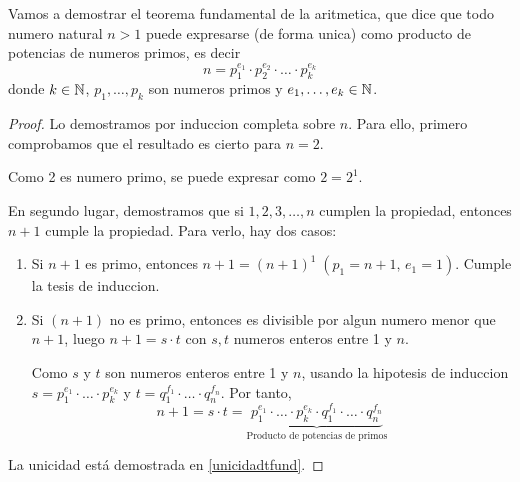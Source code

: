 \begin{example}
	\label{tfundaritmetica}
	Vamos a demostrar el teorema fundamental de la aritmetica, que dice que todo numero natural \(n > 1 \) puede expresarse (de forma unica) como producto de potencias de numeros primos, es decir
	\[
		n = p^{e_1}_1 \cdot p^{e_2}_2 \cdot \ldots \cdot p^{e_k}_k
	\]
	donde \(k \in \mathbb{N} \), \(p_1, \ldots, p_k \) son numeros primos y \(e_1, \ldots, e_k \in \mathbb{N} \).
\end{example}
\begin{proof}
	Lo demostramos por induccion completa sobre \(n \). Para ello, primero comprobamos que el resultado es cierto para \(n = 2\).
	
	Como 2 es numero primo, se puede expresar como \(2 = 2^{1}\).
	
	En segundo lugar, demostramos que si \(1,2,3,\ldots,n \) cumplen la propiedad, entonces \(n + 1 \) cumple la propiedad. Para verlo, hay dos casos:
	\begin{enumerate}
		\item Si \(n + 1\) es primo, entonces \(n + 1 = (n+1)^{1} \; (p_1 = n + 1, \, e_1 = 1 ) \). Cumple la tesis de induccion.
		\item Si \((n+1 )\) no es primo, entonces  es divisible por algun numero menor que \(n + 1 \), luego \(n + 1 = s \cdot t \) con \(s,t \) numeros enteros entre 1 y \(n\).
		      
		      Como \(s\) y \(t \) son numeros enteros entre 1 y \(n \), usando la hipotesis de induccion \(s = p^{e_1}_1 \cdot \ldots \cdot p^{e_k}_k\) y \(t = q^{f_1}_1 \cdot \ldots \cdot q^{f_n}_n  \). Por tanto,
		      \[
			      n + 1 = s \cdot t = \underbrace{p^{e_1}_1 \cdot \ldots \cdot p^{e_k}_k \cdot q^{f_1}_1 \cdot \ldots \cdot q^{f_n}_n}_{\text{Producto de potencias de primos}}
		      \]
	\end{enumerate}
	La unicidad está demostrada en \ref{unicidadtfund}.
\end{proof}

